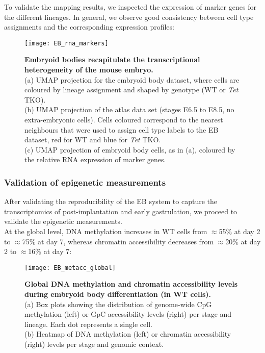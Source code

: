 To validate the mapping results, we inspected the expression of marker genes for the different lineages. In general, we observe good consistency between cell type assignments and the corresponding expression profiles:

\begin{figure}[H]
	\centering
	\texttt{[image: EB\_rna\_markers]}
	\caption[]{
	\textbf{Embryoid bodies recapitulate the transcriptional heterogeneity of the mouse embryo.}\\
	(a) UMAP projection for the embryoid body dataset, where cells are coloured by lineage assignment and shaped by genotype (WT or \textit{Tet} TKO).\\
	(b) UMAP projection of the atlas data set (stages E6.5 to E8.5, no extra-embryonic cells). Cells coloured correspond to the nearest neighbours that were used to assign cell type labels to the EB dataset, red for WT and blue for \textit{Tet} TKO.\\
	(c) UMAP projection of embryoid body cells, as in (a), coloured by the relative RNA expression of marker genes. 
	}
	\label{fig:EB_rna_markers}
\end{figure}



\subsubsection{Validation of epigenetic measurements}

After validating the reproducibility of the EB system to capture the transcriptomics of post-implantation and early gastrulation, we proceed to validate the epigenetic measurements.\\
At the global level, DNA methylation increases in WT cells from $\approx$55\% at day 2 to $\approx$75\% at day 7, whereas chromatin accessibility decreases from $\approx$20\% at day 2 to $\approx$16\% at day 7:

\begin{figure}[H]
	\centering
	\texttt{[image: EB\_metacc\_global]}
	\caption[]{
	\textbf{Global DNA methylation and chromatin accessibility levels during embryoid body differentiation (in WT cells).}\\
	(a) Box plots showing the distribution of genome-wide CpG methylation (left) or GpC accessibility levels (right) per stage and lineage. Each dot represents a single cell. \\
	(b) Heatmap of DNA methylation (left) or chromatin accessibility (right) levels per stage and genomic context.
	}
	\label{fig:EB_metacc_global}
\end{figure}

